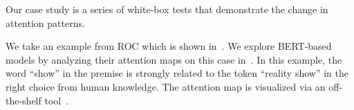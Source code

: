 

Our case study is a series of white-box tests that demonstrate
the change in attention patterns.

We take an example from ROC which is shown in~.
We explore BERT-based models by 
analyzing their attention maps on this case in~.  
In this example, the word ``show'' in the premise is strongly
related to the token ``reality show'' in the right choice from human knowledge. 
The attention map is visualized via an off-the-shelf tool~\cite{vig-2019-multiscale}.


